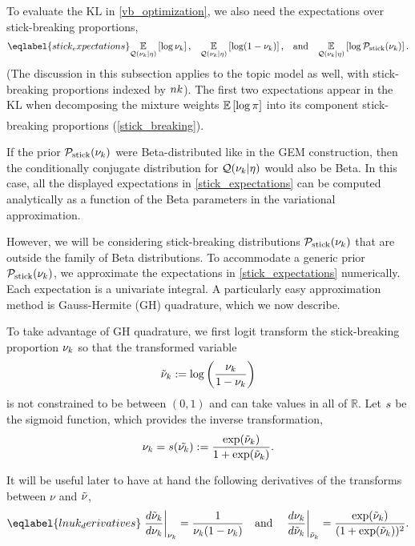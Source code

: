 To evaluate the $\mathrm{KL}$ in \eqref{vb_optimization}, we also need
the expectations over stick-breaking proportions,
\begin{align}\eqlabel{stick_expectations}
%
\expect{\q(\nuk \vert \eta)}{\log \nuk}
\textrm{,}\quad
\expect{\q(\nuk \vert \eta)}{\log (1 - \nuk)}
\textrm{,}\quad\textrm{and}\quad
\expect{\q(\nuk \vert \eta)}{\log \pstick(\nuk)}.
%
\end{align}
(The discussion in this subsection applies to the topic model as well,
with stick-breaking proportions indexed by $nk$).
The first two expectations appear in the $\mathrm{KL}$
when decomposing the mixture weights
$\underset{}{\mathbb{E}}\left[\log \pi\right]$ into its component stick-breaking proportions (\eqref{stick_breaking}).

If the prior $\mathcal{P}_{\mathrm{stick}}(\nu_{k})$ were Beta-distributed like in the GEM construction,
then the conditionally conjugate distribution for $\mathcal{Q}(\nu_{k} \vert \eta)$ would also be Beta.
In this case, all the displayed expectations in \eqref{stick_expectations}
can be computed analytically as a function of
the Beta parameters in the variational approximation.

However, we will be considering stick-breaking distributions $\mathcal{P}_{\mathrm{stick}}(\nu_{k})$ that
are outside the family of Beta distributions.
To accommodate a generic prior $\mathcal{P}_{\mathrm{stick}}(\nu_{k})$,
we approximate the expectations in \eqref{stick_expectations} numerically.
Each expectation is a univariate integral.
A particularly easy approximation method is
Gauss-Hermite (GH) quadrature, which we now describe.

To take advantage of GH quadrature, we first logit transform the stick-breaking
proportion $\nu_{k}$ so that the transformed variable
\begin{align*}
  \tilde{\nu}_{k} := \log\left(\frac{\nu_{k}}{1 - \nu_{k}}\right)
\end{align*}
is not constrained to be between $(0, 1)$ and can take values in all of $\mathbb{R}$.
Let $s$ be the sigmoid function,
which provides the inverse transformation,
\begin{align*}
  \nu_{k} = s(\tilde{\nu_{k}}) := \frac{\exp(\tilde{\nu}_k)}{1 + \exp(\tilde{\nu}_k)}.
\end{align*}

It will be useful later to have at hand the following
derivatives of the transforms between $\nu$ and $\tilde{\nu}$,
%
\begin{align}\eqlabel{lnuk_derivatives}
%
\fracat{d \lnu_\k}{ d\nuk}{\nuk} ={}
    \frac{1}{\nuk (1 - \nuk)} \mathand
%
\fracat{d \nuk}{ d\lnuk}{\lnuk} ={}
    \frac{\exp(\lnuk)}{(1 + \exp(\lnuk))^2}.
%
\end{align}


